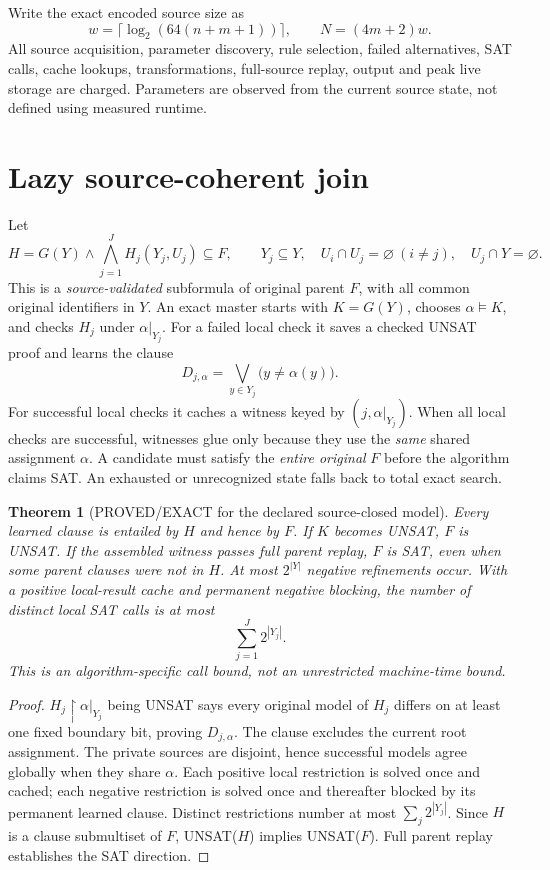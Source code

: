 \documentclass[11pt]{article}
\newtheorem{theorem}{Theorem}
\begin{document}
Write the exact encoded source size as
\[
w=\lceil\log_2(64(n+m+1))\rceil,\qquad N=(4m+2)w.
\]
All source acquisition, parameter discovery, rule selection, failed alternatives, SAT calls, cache lookups, transformations, full-source replay, output and peak live storage are charged. Parameters are observed from the current source state, not defined using measured runtime.

\section{Lazy source-coherent join}
Let
\[
H=G(Y)\land\bigwedge_{j=1}^{J}H_j(Y_j,U_j)\subseteq F,\qquad
Y_j\subseteq Y,\quad U_i\cap U_j=\varnothing~(i\ne j),\quad U_j\cap Y=\varnothing.
\]
This is a \emph{source-validated} subformula of original parent $F$, with all common original identifiers in $Y$. An exact master starts with $K=G(Y)$, chooses $\alpha\models K$, and checks $H_j$ under $\alpha|_{Y_j}$. For a failed local check it saves a checked UNSAT proof and learns the clause
\[
D_{j,\alpha}=\bigvee_{y\in Y_j}\bigl(y\ne\alpha(y)\bigr).
\]
For successful local checks it caches a witness keyed by $(j,\alpha|_{Y_j})$. When all local checks are successful, witnesses glue only because they use the \emph{same} shared assignment $\alpha$. A candidate must satisfy the \emph{entire original} $F$ before the algorithm claims SAT. An exhausted or unrecognized state falls back to total exact search.

\begin{theorem}[PROVED/EXACT for the declared source-closed model]
Every learned clause is entailed by $H$ and hence by $F$. If $K$ becomes UNSAT, $F$ is UNSAT. If the assembled witness passes full parent replay, $F$ is SAT, even when some parent clauses were not in $H$. At most $2^{|Y|}$ negative refinements occur. With a positive local-result cache and permanent negative blocking, the number of \emph{distinct local SAT calls} is at most
\[
\sum_{j=1}^{J}2^{|Y_j|}.
\]
This is an algorithm-specific call bound, not an unrestricted machine-time bound.
\end{theorem}
\begin{proof}
$H_j\upharpoonright\alpha|_{Y_j}$ being UNSAT says every original model of $H_j$ differs on at least one fixed boundary bit, proving $D_{j,\alpha}$. The clause excludes the current root assignment. The private sources are disjoint, hence successful models agree globally when they share $\alpha$. Each positive local restriction is solved once and cached; each negative restriction is solved once and thereafter blocked by its permanent learned clause. Distinct restrictions number at most $\sum_j2^{|Y_j|}$. Since $H$ is a clause submultiset of $F$, UNSAT($H$) implies UNSAT($F$). Full parent replay establishes the SAT direction.
\end{proof}
\end{document}
